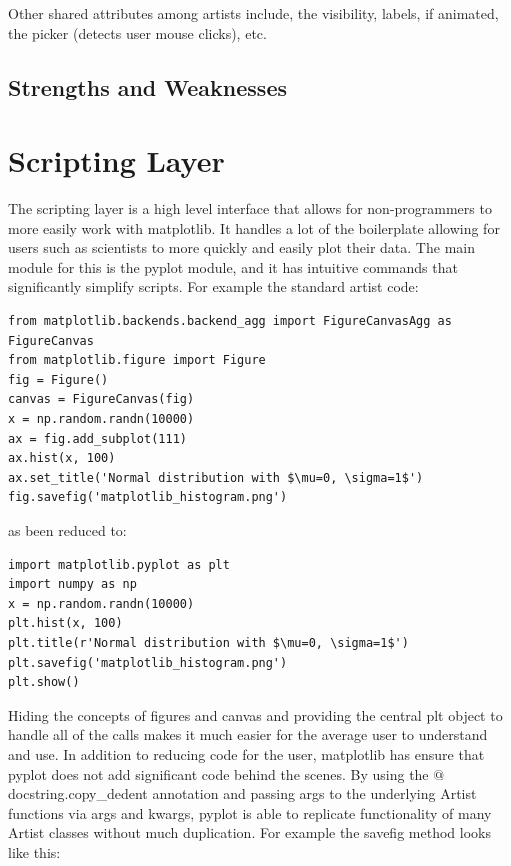 \documentclass[pdftex,10pt,a4paper]{report}
\begin{document}
Other shared attributes among artists include, the visibility, labels, if animated, the picker (detects user mouse clicks), etc.

\subsection{Strengths and Weaknesses}


\section{Scripting Layer}

The scripting layer is a high level interface that allows for non-programmers to more easily work with matplotlib. It handles a lot of the boilerplate allowing for users such as scientists to more quickly and easily plot their data. The main module for this is the pyplot module, and it has intuitive commands that significantly simplify scripts. For example the standard artist code:

\begin{lstlisting}
from matplotlib.backends.backend_agg import FigureCanvasAgg as FigureCanvas
from matplotlib.figure import Figure
fig = Figure()
canvas = FigureCanvas(fig)
x = np.random.randn(10000)
ax = fig.add_subplot(111)
ax.hist(x, 100)
ax.set_title('Normal distribution with $\mu=0, \sigma=1$')
fig.savefig('matplotlib_histogram.png')
\end{lstlisting}
as been reduced to:

\begin{lstlisting}
import matplotlib.pyplot as plt
import numpy as np
x = np.random.randn(10000)
plt.hist(x, 100)
plt.title(r'Normal distribution with $\mu=0, \sigma=1$')
plt.savefig('matplotlib_histogram.png')
plt.show()
\end{lstlisting}


Hiding the concepts of figures and canvas and providing the central plt object to handle all of the calls makes it much easier for the average user to understand and use.
In addition to reducing code for the user, matplotlib has ensure that pyplot does not add significant code behind the scenes. By using the $@$docstring.copy\_dedent annotation and passing args to the underlying Artist functions via \*args and \*\*kwargs, pyplot is able to replicate functionality of many Artist classes without much duplication. For example the savefig method looks like this:
\end{document}
